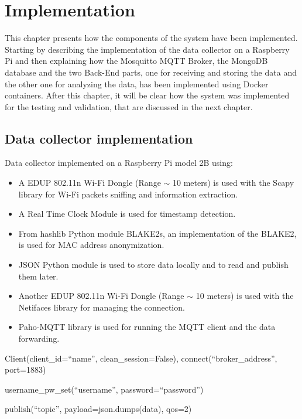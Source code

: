 \chapter{Implementation}
\label{cha:implementation}
\vspace{0.4 cm} 

This chapter presents how the components of the system have been implemented.
Starting by describing the implementation of the data collector on a Raspberry Pi and then explaining how the Mosquitto MQTT Broker, the MongoDB database and the two Back-End parts, one for receiving and storing the data and the other one for analyzing the data, has been implemented using Docker containers. After this chapter, it will be clear how the system was implemented for the testing and validation, that are discussed in the next chapter.


\section{Data collector implementation}
\label{sec:collector}
\vspace{0.2 cm} 

Data collector implemented on a Raspberry Pi model 2B using:
\begin{itemize}
  \item A EDUP 802.11n Wi-Fi Dongle (Range $\sim$ 10 meters) is used with the Scapy library for Wi-Fi packets sniffing and information extraction.
  \item A Real Time Clock Module is used for timestamp detection.
  \item From hashlib Python module BLAKE2s, an implementation of the BLAKE2, is used for MAC address anonymization.
  \item JSON Python module is used to store data locally and to read and publish them later.
  \item Another EDUP 802.11n Wi-Fi Dongle (Range $\sim$ 10 meters) is used with the Netifaces library for managing the connection.
  \item Paho-MQTT library is used for running the MQTT client and the data forwarding.
\end{itemize}

Client(client\_id=``name'', clean\_session=False), connect(``broker\_address'', port=1883)

username\_pw\_set(``username'', password=``password'')

publish(``topic'', payload=json.dumps(data), qos=2)

